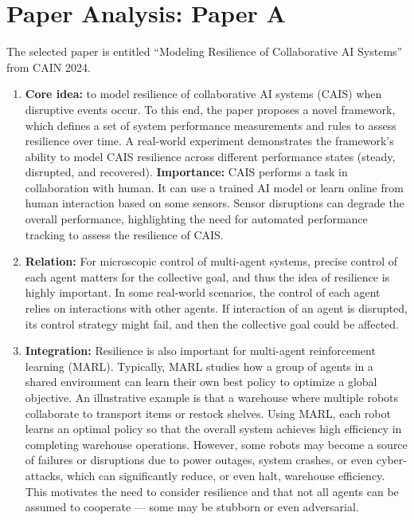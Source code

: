 \documentclass[11pt]{article}
\begin{document}
\section{Paper Analysis: Paper A}
The selected paper is entitled ``Modeling Resilience of Collaborative AI Systems'' from CAIN 2024.
\begin{enumerate}
    \item \textbf{Core idea:} to model resilience of collaborative AI systems (CAIS) when disruptive events occur. To this end, the paper proposes a novel framework, which defines a set of system performance measurements and rules to assess resilience over time. A real-world experiment demonstrates the framework's ability to model CAIS resilience across different performance states (steady, disrupted, and recovered). \textbf{Importance:} CAIS performs a task in collaboration with human. It can use a trained AI model or learn online from human interaction based on some sensors. Sensor disruptions can degrade the overall performance, highlighting the need for automated performance tracking to assess the resilience of CAIS.
    \item \textbf{Relation:} For microscopic control of multi-agent systems, precise control of each agent matters for the collective goal, and thus the idea of resilience is highly important. In some real-world scenarios, the control of each agent relies on interactions with other agents. If interaction of an agent is disrupted, its control strategy might fail, and then the collective goal could be affected.
    \item \textbf{Integration:} Resilience is also important for multi-agent reinforcement learning (MARL). Typically, MARL studies how a group of agents in a shared environment can learn their own best policy to optimize a global objective. An illustrative example is that a warehouse where multiple robots collaborate to transport items or restock shelves. Using MARL, each robot learns an optimal policy so that the overall system achieves high efficiency in completing warehouse operations. However, some robots may become a source of failures or disruptions due to power outages, system crashes, or even cyber-attacks, which can significantly reduce, or even halt, warehouse efficiency. This motivates the need to consider resilience and that not all agents can be assumed to cooperate --- some may be stubborn or even adversarial.

\end{enumerate}
\end{document}
